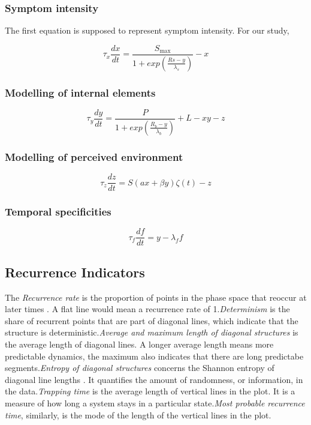 \documentclass[utf8]{FrontiersinVancouver}
\begin{document}
\subsubsection{Symptom intensity}
The first equation is supposed to represent symptom intensity. For our study, 

\begin{equation}
    \tau_{x}\frac{dx}{dt} = \frac{S_{\max}}{1+exp(\frac{Rs-y}{\lambda_{s}})} - x
\end{equation}


\subsubsection{Modelling of internal elements}

\begin{equation}
    \tau_{y}\frac{dy}{dt} = \frac{P}{1+exp(\frac{R_{b}-y}{\lambda_{b}})} + L - xy - z
\end{equation}

\subsubsection{Modelling of perceived environment}

\begin{equation}
    \tau_{z}\frac{dz}{dt} = S(ax + \beta y)\zeta(t) - z
\end{equation}


\subsubsection{Temporal specificities}

\begin{equation}
    \tau_f\frac{df}{dt} = y - \lambda_f f
\end{equation}

\subsection{Recurrence Indicators}

The \textit{Recurrence rate} is the proportion of points in the phase space that reoccur at later times \citep{webber2005recurrence}. A flat line would mean a recurrence rate of 1.\@\textit{Determinism} is the share of recurrent points that are part of diagonal lines, which indicate that the structure is deterministic.\@\textit{Average and maximum length of diagonal structures} is the average length of diagonal lines. A longer average length means more predictable dynamics, the maximum also indicates that there are long predictabe segments.\@\textit{Entropy of diagonal structures} concerns the Shannon entropy of diagonal line lengths \citep{kraemerRecurrenceThresholdSelection2018}. It quantifies the amount of randomness, or information, in the data.\@\textit{Trapping time} is the average length of vertical lines in the plot. It is a measure of how long a system stays in a particular state.\@\textit{Most probable recurrence time}, similarly, is the mode of the length of the vertical lines in the plot. 
\end{document}
